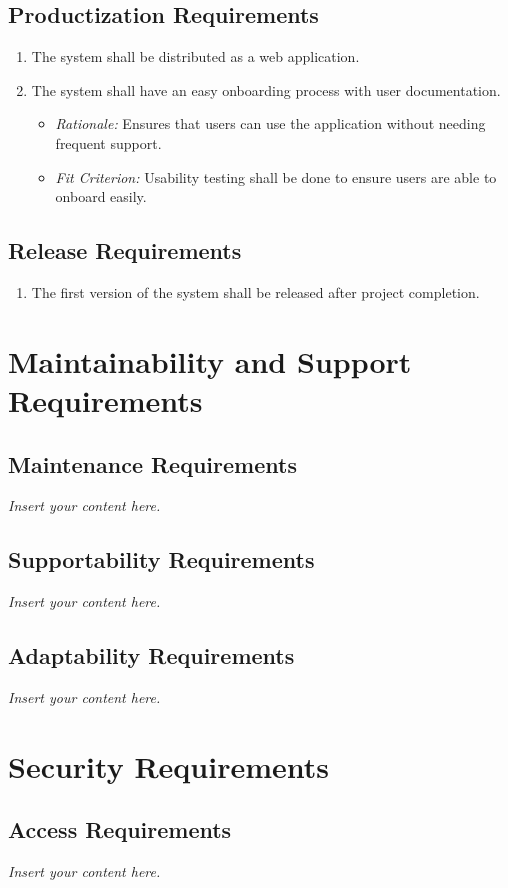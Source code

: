 \documentclass[12pt]{article}
\newcommand{\lips}{\textit{Insert your content here.}}
\begin{document}
\subsection{Productization Requirements}
\begin{enumerate}
  \item The system shall be distributed as a web application.
  \item The system shall have an easy onboarding process with user documentation.
  \begin{itemize}
    \item \textit{Rationale:} Ensures that users can use the application without needing frequent support.
    \item \textit{Fit Criterion:} Usability testing shall be done to ensure users are able to onboard easily.
  \end{itemize}
\end{enumerate}

\subsection{Release Requirements}
\begin{enumerate}
  \item The first version of the system shall be released after project completion.
\end{enumerate}

\section{Maintainability and Support Requirements}
\subsection{Maintenance Requirements}
\lips
\subsection{Supportability Requirements}
\lips
\subsection{Adaptability Requirements}
\lips

\section{Security Requirements}
\subsection{Access Requirements}
\lips
\end{document}

